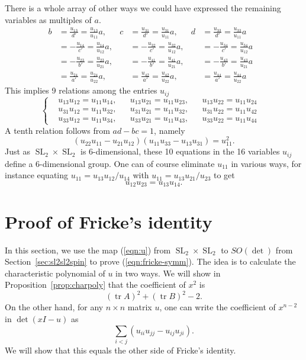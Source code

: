 \documentclass[11pt]{amsart}
\theoremstyle{definition}
\numberwithin{figure}{section}
\numberwithin{equation}{section}
\numberwithin{table}{section}
\newcommand{\SL}{\operatorname{SL}}
\newcommand{\tr}{\operatorname{tr}}
\begin{document}
There is a whole array of other ways we could have expressed the remaining variables as multiples of $a$.
\[
\begin{aligned}
b&=\frac{u_{13}}{d'}=\frac{u_{13}}{u_{11}} a,& c&=\frac{u_{31}}{d'}=\frac{u_{31}}{u_{11}} a,& d&=\frac{u_{33}}{d'}=\frac{u_{33}}{u_{11}} a& \\
&=-\frac{u_{14}}{c'}=\frac{u_{14}}{u_{12}} a,& &=-\frac{u_{32}}{c'}=\frac{u_{32}}{u_{12}} a,& &=-\frac{u_{34}}{c'}=\frac{u_{34}}{u_{12}} a& \\
&=-\frac{u_{23}}{b'}=\frac{u_{23}}{u_{21}} a,& &=-\frac{u_{41}}{b'}=\frac{u_{41}}{u_{21}} a,& &=-\frac{u_{43}}{b'}=\frac{u_{43}}{u_{21}} a& \\
&=\frac{u_{24}}{a'}=\frac{u_{24}}{u_{22}} a,& &=\frac{u_{42}}{a'}=\frac{u_{42}}{u_{22}} a,& &=\frac{u_{44}}{a'}=\frac{u_{44}}{u_{22}} a&
\end{aligned}
\]
This implies 9 relations among the entries $u_{ij}$
\begin{equation} \label{eqn:9-quadratic-relations}
\left\{
\begin{aligned}
&u_{13}u_{12}=u_{11}u_{14},& &u_{13}u_{21}=u_{11}u_{23},& &u_{13}u_{22}=u_{11}u_{24}& \\
&u_{31}u_{12}=u_{11}u_{32},& &u_{31}u_{21}=u_{11}u_{32},& &u_{31}u_{22}=u_{11}u_{42}& \\
&u_{33}u_{12}=u_{11}u_{34},& &u_{33}u_{21}=u_{11}u_{43},& &u_{33}u_{22}=u_{11}u_{44}&
\end{aligned}
\right.
\end{equation}
A tenth relation follows from $ad-bc=1$, namely
\begin{equation} \label{eqn:det-tenth}
(u_{22}u_{11}-u_{21}u_{12})(u_{11}u_{33}-u_{13}u_{31})=u_{11}^2
.
\end{equation}
Just as $\SL_2 \times \SL_2$ is 6-dimensional, these 10 equations in the 16 variables $u_{ij}$ define a 6-dimensional group.
One can of course eliminate $u_{11}$ in various ways, for instance equating $u_{11}=u_{13}u_{12}/u_{14}$ with $u_{11}=u_{13}u_{21}/u_{23}$ to get
\[
u_{12}u_{23}=u_{13}u_{14}.
\]

\section{Proof of Fricke's identity} \label{sec:profricke}

In this section, we use the map (\ref{eqn:u}) from $\SL_2 \times \SL_2$ to $SO(\det)$ from Section~\ref{sec:sl2sl2spin} to prove (\ref{eqn:fricke-symm}).
The idea is to calculate the characteristic polynomial of $u$ in two ways.
We will show in Proposition~\ref{prop:charpoly} that the coefficient of $x^2$ is
\[
(\tr{A})^2+(\tr{B})^2-2.
\]
On the other hand, for any $n \times n$ matrix $u$, one can write the coefficient of $x^{n-2}$ in $\det(xI-u)$ as
\[
\sum_{i<j} (u_{ii}u_{jj}-u_{ij}u_{ji}).
\]
We will show that this equals the other side of Fricke's identity.
\end{document}
